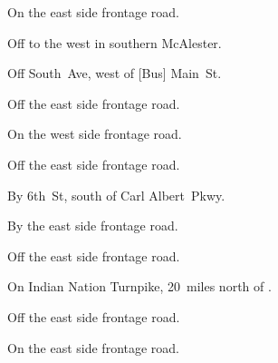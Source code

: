 
\begin{LocationList}

On the east side  frontage road.

Off  to the west in southern McAlester.

Off South~Ave, west of [Bus] Main~St.

\Location{\GarageHQ \Garage}
Off the east side  frontage road.

On the west side  frontage road.

Off the east side  frontage road.

By 6th~St, south of  Carl Albert~Pkwy.

By the east side  frontage road.

\Location{\TruckService \Service}
Off the east side  frontage road.

\Location{\TruckStop \Gas \Rest}
On  Indian Nation Turnpike, 20~miles north of .

Off the east side  frontage road.

On the east side  frontage road.

\end{LocationList}
